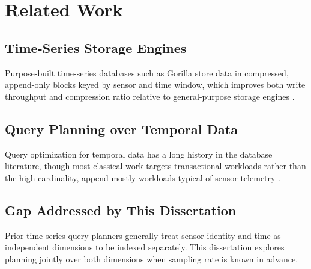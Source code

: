 \chapter{Related Work}
\label{cap:related}

\section{Time-Series Storage Engines}
Purpose-built time-series databases such as Gorilla store data in
compressed, append-only blocks keyed by sensor and time window, which
improves both write throughput and compression ratio relative to
general-purpose storage engines \cite{Pelkonen2015}.

\section{Query Planning over Temporal Data}
Query optimization for temporal data has a long history in the database
literature, though most classical work targets transactional workloads
rather than the high-cardinality, append-mostly workloads typical of sensor
telemetry \cite{Jensen2017}.

\section{Gap Addressed by This Dissertation}
Prior time-series query planners generally treat sensor identity and time
as independent dimensions to be indexed separately. This dissertation
explores planning jointly over both dimensions when sampling rate is known
in advance.
